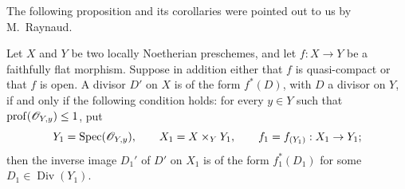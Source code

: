 
The following proposition and its corollaries were pointed out to us by
M.~Raynaud.

\begin{proposition}[21.4.9]
\ifdefined\EGAIVSuppressErratumLabels\else\label{IV.21.4.9}\fi
Let $X$ and $Y$ be two locally Noetherian preschemes, and let
$f:X\to Y$ be a faithfully flat morphism.  Suppose in addition either
that $f$ is quasi-compact or that $f$ is open.  A divisor $D'$ on $X$
is of the form $f^*(D)$, with $D$ a divisor on $Y$, if and only if the
following condition holds: for every $y\in Y$ such that
$\operatorname{prof}(\mathscr{O}_{Y,y})\leq 1$, put
\[
 Y_1=\operatorname{Spec}(\mathscr{O}_{Y,y}),\qquad
 X_1=X\times_Y Y_1,
 \qquad f_1=f_{(Y_1)}:X_1\to Y_1;
\]
then the inverse image $D_1'$ of $D'$ on $X_1$ is of the form
$f_1^*(D_1)$ for some $D_1\in\operatorname{Div}(Y_1)$.
\end{proposition}

